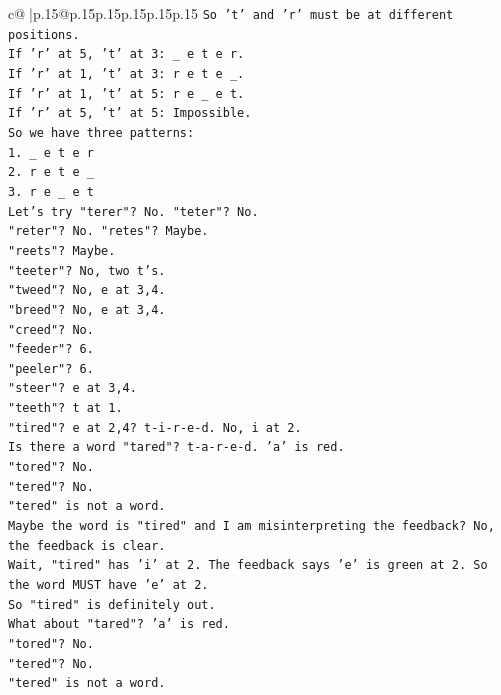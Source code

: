 \documentclass{article}
\begin{document}
{\begin{supertabular}{c@{$\;$}|p{.15\linewidth}@{}p{.15\linewidth}p{.15\linewidth}p{.15\linewidth}p{.15\linewidth}p{.15\linewidth}}
{{{\texttt{So 't' and 'r' must be at different positions.} \\
\texttt{If 'r' at 5, 't' at 3: \_ e t e r.} \\
\texttt{If 'r' at 1, 't' at 3: r e t e \_.} \\
\texttt{If 'r' at 1, 't' at 5: r e \_ e t.} \\
\texttt{If 'r' at 5, 't' at 5: Impossible.} \\
\texttt{So we have three patterns:} \\
\texttt{1. \_ e t e r} \\
\texttt{2. r e t e \_} \\
\texttt{3. r e \_ e t} \\
\texttt{Let's try "terer"? No. "teter"? No.} \\
\texttt{"reter"? No. "retes"? Maybe.} \\
\texttt{"reets"? Maybe.} \\
\texttt{"teeter"? No, two t's.} \\
\texttt{"tweed"? No, e at 3,4.} \\
\texttt{"breed"? No, e at 3,4.} \\
\texttt{"creed"? No.} \\
\texttt{"feeder"? 6.} \\
\texttt{"peeler"? 6.} \\
\texttt{"steer"? e at 3,4.} \\
\texttt{"teeth"? t at 1.} \\
\texttt{"tired"? e at 2,4? t{-}i{-}r{-}e{-}d. No, i at 2.} \\
\texttt{Is there a word "tared"? t{-}a{-}r{-}e{-}d. 'a' is red.} \\
\texttt{"tored"? No.} \\
\texttt{"tered"? No.} \\
\texttt{"tered" is not a word.} \\
\texttt{Maybe the word is "tired" and I am misinterpreting the feedback? No, the feedback is clear.} \\
\texttt{Wait, "tired" has 'i' at 2. The feedback says 'e' is green at 2. So the word MUST have 'e' at 2.} \\
\texttt{So "tired" is definitely out.} \\
\texttt{What about "tared"? 'a' is red.} \\
\texttt{"tored"? No.} \\
\texttt{"tered"? No.} \\
\texttt{"tered" is not a word.} \\
}}}
\end{supertabular}}
\end{document}
